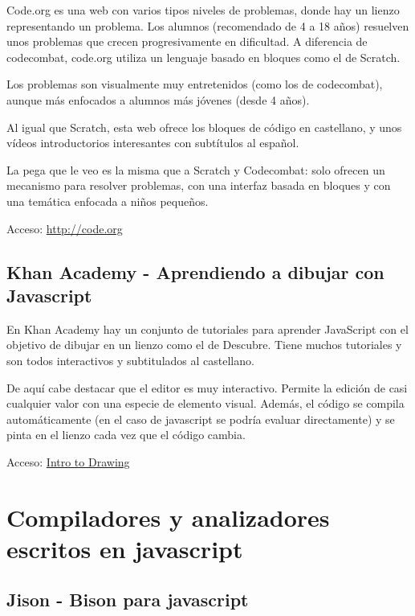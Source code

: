 \documentclass{report}
\begin{document}
	Code.org es una web con varios tipos niveles de problemas, donde hay un lienzo representando un problema. Los alumnos (recomendado de 4 a 18 años) resuelven unos problemas que crecen progresivamente en dificultad. A diferencia de codecombat, code.org utiliza un lenguaje basado en bloques como el de Scratch. 
	
	Los problemas son visualmente muy entretenidos (como los de codecombat), aunque más enfocados a alumnos más jóvenes (desde 4 años).
	
	Al igual que Scratch, esta web ofrece los bloques de código en castellano, y unos vídeos introductorios interesantes con subtítulos al español.
	
	La pega que le veo es la misma que a Scratch y Codecombat: solo ofrecen un mecanismo para resolver problemas, con una interfaz basada en bloques y con una temática enfocada a niños pequeños.
	
	\hfill
	
	Acceso: \url{http://code.org}
	
	\subsection{Khan Academy - Aprendiendo a dibujar con Javascript}
	
	En Khan Academy hay un conjunto de tutoriales para aprender JavaScript con el objetivo de dibujar en un lienzo como el de Descubre. Tiene muchos tutoriales y son todos interactivos y subtitulados al castellano.
	
	\hfill
	
	De aquí cabe destacar que el editor es muy interactivo. Permite la edición de casi cualquier valor con una especie de elemento visual. Además, el código se compila automáticamente (en el caso de javascript se podría evaluar directamente) y se pinta en el lienzo cada vez que el código cambia. 
	
	\hfill
	
	Acceso: 
	\href{https://es.khanacademy.org/computing/hour-of-code/hour-of-code-tutorial/p/intro-to-drawing}{Intro to Drawing}
	
	\section{Compiladores y analizadores escritos en javascript}
	
	\subsection{Jison - Bison para javascript}
	
\end{document}

